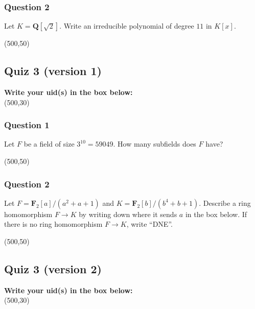\documentclass[11pt]{article}
\begin{document}
\subsubsection{Question 2}
\label{sec:org3b28b65}

Let \(K = \mathbf{Q}[\sqrt 2]\).
Write an irreducible polynomial of degree \(11\) in \(K[x]\).

\noindent
\framebox(500,50)

\vspace{1cm}
\subsection{Quiz 3 (version 1)}
\label{sec:org1069791}
\vspace{1cm}

\noindent
\textbf{Write your uid(s) in the box below:}\\
\framebox(500,30)

\vspace{1cm}
\subsubsection{Question 1}
\label{sec:orgceee202}

Let \(F\) be a field of size \(3^{10} = 59049\).
How many subfields does \(F\) have?

\noindent
\framebox(500,50)

\vspace{1cm}
\subsubsection{Question 2}
\label{sec:orge37bd64}
Let \(F = \mathbf{F}_2[a]/(a^2+a+1)\) and \(K = \mathbf{F}_2[b]/(b^4+b+1)\).
Describe a ring homomorphism \(F \to K\) by writing down where it sends \(a\) in the box below.
If there is no ring homomorphism \(F \to K\), write ``DNE''.

\noindent
\framebox(500,50)

\vspace{3cm}
\subsection{Quiz 3 (version 2)}
\label{sec:org0d273cb}
\vspace{1cm}

\noindent
\textbf{Write your uid(s) in the box below:}\\
\framebox(500,30)

\vspace{1cm}
\end{document}
